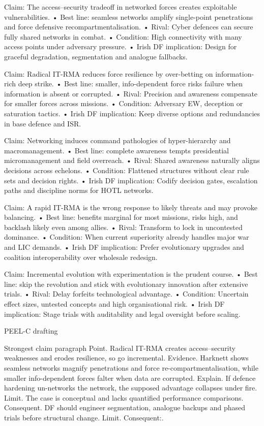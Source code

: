 Claim: The access–security tradeoff in networked forces creates exploitable vulnerabilities.
• Best line: seamless networks amplify single-point penetrations and force defensive recompartmentalisation. {\small }
• Rival: Cyber defences can secure fully shared networks in combat.
• Condition: High connectivity with many access points under adversary pressure.
• Irish DF implication: Design for graceful degradation, segmentation and analogue fallbacks.

Claim: Radical IT-RMA reduces force resilience by over-betting on information-rich deep strike.
• Best line: smaller, info-dependent force risks failure when information is absent or corrupted. {\small }
• Rival: Precision and awareness compensate for smaller forces across missions.
• Condition: Adversary EW, deception or saturation tactics.
• Irish DF implication: Keep diverse options and redundancies in base defence and ISR.

Claim: Networking induces command pathologies of hyper-hierarchy and macromanagement.
• Best line: complete awareness tempts presidential micromanagement and field overreach. {\small }
• Rival: Shared awareness naturally aligns decisions across echelons.
• Condition: Flattened structures without clear rule sets and decision rights.
• Irish DF implication: Codify decision gates, escalation paths and discipline norms for HOTL networks.

Claim: A rapid IT-RMA is the wrong response to likely threats and may provoke balancing.
• Best line: benefits marginal for most missions, risks high, and backlash likely even among allies. {\small }
• Rival: Transform to lock in uncontested dominance.
• Condition: When current superiority already handles major war and LIC demands.
• Irish DF implication: Prefer evolutionary upgrades and coalition interoperability over wholesale redesign.

Claim: Incremental evolution with experimentation is the prudent course.
• Best line: skip the revolution and stick with evolutionary innovation after extensive trials. {\small }
• Rival: Delay forfeits technological advantage.
• Condition: Uncertain effect sizes, untested concepts and high organisational risk.
• Irish DF implication: Stage trials with auditability and legal oversight before scaling.

PEEL-C drafting

Strongest claim paragraph
Point. Radical IT-RMA creates access–security weaknesses and erodes resilience, so go incremental.
Evidence. Harknett shows seamless networks magnify penetrations and force re-compartmentalisation, while smaller info-dependent forces falter when data are corrupted. {\small }
Explain. If defence hardening un-networks the network, the supposed advantage collapses under fire.
Limit. The case is conceptual and lacks quantified performance comparisons.
Consequent. DF should engineer segmentation, analogue backups and phased trials before structural change. Limit. Consequent:.

